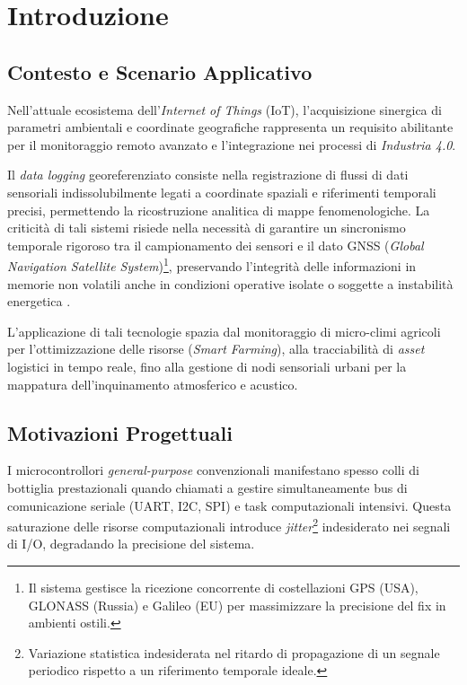 \newpage
\section{Introduzione}

\subsection{Contesto e Scenario Applicativo}
Nell'attuale ecosistema dell'\textit{Internet of Things} (IoT), l'acquisizione sinergica di parametri ambientali e coordinate geografiche rappresenta un requisito abilitante per il monitoraggio remoto avanzato e l'integrazione nei processi di \textit{Industria 4.0}.

Il \textit{data logging} georeferenziato consiste nella registrazione di flussi di dati sensoriali indissolubilmente legati a coordinate spaziali e riferimenti temporali precisi, permettendo la ricostruzione analitica di mappe fenomenologiche. La criticità di tali sistemi risiede nella necessità di garantire un sincronismo temporale rigoroso tra il campionamento dei sensori e il dato GNSS (\textit{Global Navigation Satellite System})\footnote{Il sistema gestisce la ricezione concorrente di costellazioni GPS (USA), GLONASS (Russia) e Galileo (EU) per massimizzare la precisione del fix in ambienti ostili.}, preservando l'integrità delle informazioni in memorie non volatili anche in condizioni operative isolate o soggette a instabilità energetica \cite{sam_m8q_ds}.

L'applicazione di tali tecnologie spazia dal monitoraggio di micro-climi agricoli per l'ottimizzazione delle risorse (\textit{Smart Farming}), alla tracciabilità di \textit{asset} logistici in tempo reale, fino alla gestione di nodi sensoriali urbani per la mappatura dell'inquinamento atmosferico e acustico.

\subsection{Motivazioni Progettuali}
I microcontrollori \textit{general-purpose} convenzionali manifestano spesso colli di bottiglia prestazionali quando chiamati a gestire simultaneamente bus di comunicazione seriale (UART, I2C, SPI) e task computazionali intensivi. Questa saturazione delle risorse computazionali introduce \textit{jitter}\footnote{Variazione statistica indesiderata nel ritardo di propagazione di un segnale periodico rispetto a un riferimento temporale ideale.} indesiderato nei segnali di I/O, degradando la precisione del sistema. 

